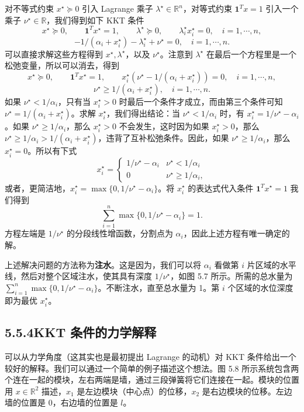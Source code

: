 \documentclass[UTF8, 12pt, fontset=fandol, oneside]{ctexart}
\begin{document}
对不等式约束 $x^\star\succeq 0$ 引入 Lagrange 乘子 $\lambda^\star\in\mathbb{R}^n$，对等式约束 $\mathbf{1}^Tx=1$ 引入一个乘子 $\nu^\star\in\mathbb{R}$，我们得到如下 KKT 条件
\[
x^\star\succeq 0,\qquad \mathbf{1}^Tx^\star=1,\qquad
\lambda^\star\succeq 0,\qquad \lambda_i^\star x_i^\star=0,\quad i=1,\cdots,n,
\]
\[
-1/(\alpha_i+x_i^\star)-\lambda_i^\star+\nu^\star=0,\quad i=1,\cdots,n.
\]
可以直接求解这些方程得到 $x^\star,\lambda^\star$，以及 $\nu^\star$。注意到 $\lambda^\star$ 在最后一个方程里是一个松弛变量，所以可以消去，得到
\[
x^\star\succeq 0,\qquad \mathbf{1}^Tx^\star=1,\qquad
x_i^\star(\nu^\star-1/(\alpha_i+x_i^\star))=0,\quad i=1,\cdots,n,
\]
\[
\nu^\star\geq 1/(\alpha_i+x_i^\star),\quad i=1,\cdots,n.
\]
如果 $\nu^\star<1/\alpha_i$，只有当 $x_i^\star>0$ 时最后一个条件才成立，而由第三个条件可知 $\nu^\star=1/(\alpha_i+x_i^\star)$。求解 $x_i^\star$，我们得出结论：当 $\nu^\star<1/\alpha_i$ 时，有 $x_i^\star=1/\nu^\star-\alpha_i$。如果 $\nu^\star\geq 1/\alpha_i$，那么 $x_i^\star>0$ 不会发生，这时因为如果 $x_i^\star>0$，那么 $\nu^\star\geq 1/\alpha_i>1/(\alpha_i+x_i^\star)$，违背了互补松弛条件。因此，如果 $\nu^\star\geq 1/\alpha_i$，那么 $x_i^\star=0$。所以有下式
\[
x_i^\star=
\begin{cases}
1/\nu^\star-\alpha_i & \nu^\star<1/\alpha_i\\
0 & \nu^\star\geq 1/\alpha_i,
\end{cases}
\]
或者，更简洁地，$x_i^\star=\max\{0,1/\nu^\star-\alpha_i\}$。将 $x_i^\star$ 的表达式代入条件 $\mathbf{1}^Tx^\star=1$ 我们得到
\[
\sum_{i=1}^n\max\{0,1/\nu^\star-\alpha_i\}=1.
\]
方程左端是 $1/\nu^\star$ 的分段线性增函数，分割点为 $\alpha_i$，因此上述方程有唯一确定的解。

上述解决问题的方法称为\textbf{注水}。这是因为，我们可以将 $\alpha_i$ 看做第 $i$ 片区域的水平线，然后对整个区域注水，使其具有深度 $1/\nu^\star$，如图 5.7 所示。所需的总水量为 $\sum_{i=1}^n\max\{0,1/\nu^\star-\alpha_i\}$。不断注水，直至总水量为 1。第 $i$ 个区域的水位深度即为最优 $x_i^\star$。

\subsection*{5.5.4\quad KKT 条件的力学解释}

可以从力学角度（这其实也是最初提出 Lagrange 的动机）对 KKT 条件给出一个较好的解释。我们可以通过一个简单的例子描述这个想法。图 5.8 所示系统包含两个连在一起的模块，左右两端是墙，通过三段弹簧将它们连接在一起。模块的位置用 $x\in\mathbb{R}^2$ 描述，$x_1$ 是左边模块（中心点）的位移，$x_2$ 是右边模块的位移。左边墙的位置是 0，右边墙的位置是 $l$。
\end{document}
